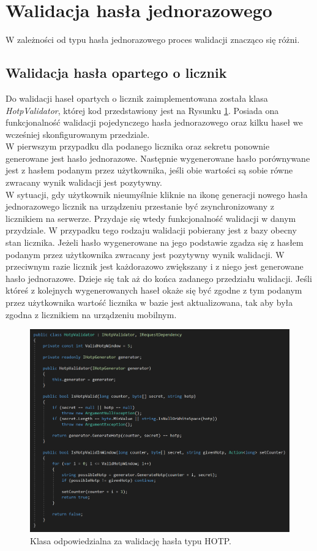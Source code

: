 \section{Walidacja hasła jednorazowego}
W zależności od typu hasła jednorazowego proces walidacji znacząco się różni.

\subsection{Walidacja hasła opartego o licznik}
Do walidacji haseł opartych o licznik zaimplementowana została klasa \textit{HotpValidator}, której kod przedstawiony jest 
na Rysunku \ref{hotp-validator}. Posiada ona funkcjonalność walidacji pojedynczego hasła jednorazowego 
oraz kilku haseł we wcześniej skonfigurowanym przedziale. \\
W pierwszym przypadku dla podanego licznika oraz sekretu ponownie generowane jest hasło jednorazowe.
Następnie wygenerowane hasło porównywane jest z hasłem podanym przez użytkownika, jeśli obie wartości są sobie równe
zwracany wynik walidacji jest pozytywny. \\
W sytuacji, gdy użytkownik nieumyślnie kliknie na ikonę generacji nowego hasła jednorazowego 
licznik na urządzeniu przestanie być zsynchronizowany z licznikiem na serwerze. 
Przydaje się wtedy funkcjonalność walidacji w danym przydziale. 
W przypadku tego rodzaju walidacji pobierany jest z bazy obecny stan licznika. 
Jeżeli hasło wygenerowane na jego podstawie zgadza się z hasłem podanym przez użytkownika zwracany jest 
pozytywny wynik walidacji. 
W przeciwnym razie licznik jest każdorazowo zwiększany i z niego jest generowane hasło jednorazowe. 
Dzieje się tak aż do końca zadanego przedziału walidacji. 
Jeśli któreś z kolejnych wygenerowanych haseł okaże się być zgodne z tym podanym przez użytkownika 
wartość licznika w bazie jest aktualizowana, tak aby była zgodna z licznikiem na urządzeniu mobilnym.
\begin{figure}[t]
    \centering
	\includegraphics[width=\textwidth]{content/images/code-hvalidator}
    \caption{Klasa odpowiedzialna za walidację hasła typu HOTP.}
    \label{hotp-validator}
\end{figure} 

